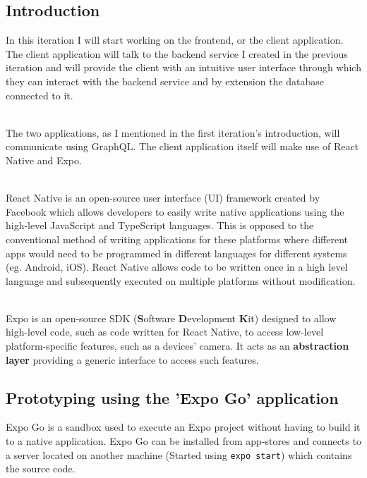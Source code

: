 \documentclass[../../main.tex]{subfiles}
\begin{document}
\subsection{Introduction}

In this iteration I will start working on the frontend, or the client application. The client
application will talk to the backend service I created in the previous iteration and will
provide the client with an intuitive user interface through which they can interact with the
backend service and by extension the database connected to it.

\noindent \\ The two applications, as I mentioned in the first iteration's introduction,
will communicate using GraphQL. The client application itself will make use of
React Native and Expo.

\noindent \\ React Native is an open-source user interface (UI) framework created by
Facebook which allows developers to easily write native applications using
the high-level JavaScript and TypeScript languages. This is opposed to the conventional method
of writing applications for these platforms where different apps would need to be programmed
in different languages for different systems (eg. Android, iOS). React Native allows code to
be written once in a high level language and subsequently executed on multiple
platforms without modification.

\noindent \\ Expo is an open-source SDK (\textbf{S}oftware \textbf{D}evelopment \textbf{K}it) designed to allow high-level code, such as code
written for React Native, to access low-level platform-specific features, such as a devices' camera.
It acts as an \textbf{abstraction layer} providing a generic interface to access such features.

\begin{comment}
\noindent \\ Therefore, the first task to do is to initialise an Expo project and install
our dependencies, notably the Apollo GraphQL client.\
\end{comment}

\subsection{Prototyping using the 'Expo Go' application}

Expo Go is a sandbox used to execute an Expo project without having to build it to a native application.
Expo Go can be installed from app-stores and connects to a server located
on another machine (Started using \lstinline{expo start}) which contains the source code.
\end{document}
